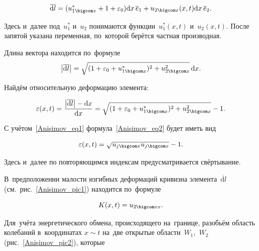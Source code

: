 $$\overline{\mathrm{d}l}=(u^{*}_{1 \bigcom x}+1+\varepsilon_0)\mathrm{d}x\,\overline{e}_1+u_{2 \bigcom x}( x,  t )\mathrm{d}x\,\overline{e}_2.$$

Здесь и~далее под~$u_1^{*}$ и~$u_2$ понимаются функции~$u_1^{*}( x,  t )$ и~$u_2( x,  t )$. После запятой указана переменная, по~которой берётся частная производная.

Длина вектора находится по~формуле $$\left|\overline{\mathrm{d}l}\right|=\sqrt{(1+\varepsilon_0+u_{1 \bigcom x}^{*})^2+u_{2 \bigcom x}^2}\,\mathrm{d}x.$$



Найдём относительную деформацию элемента:

\begin{equation}\label{Anisimov_eq2}

\varepsilon( x,  t )=\frac{\left|\overline{\mathrm{d}l}\right|-\mathrm{d}x}{\mathrm{d}x}= \sqrt{(1+\varepsilon_0+u_{1 \bigcom x}^{*})^2+u_{2 \bigcom x}^2}-1.

\end{equation}

С учётом~\eqref{Anisimov_eq1} формула~\eqref{Anisimov_eq2} будет иметь вид

\begin{equation}\label{Anisimov_eq3}

\varepsilon( x,  t )=\sqrt{u_{j \bigcom x}u_{j \bigcom x}}-1.

\end{equation}

Здесь и~далее по повторяющимся  индексам  предусматривается свёртывание.



В~предположении малости изгибных деформаций  кривизна элемента~$\overline{\mathrm{d}l}$ (см.~рис.~\ref{Anisimov_pic1}) находится по~формуле

\begin{equation}\label{Anisimov_eq4}

K( x,  t )=u_{2 \bigcom xx}.

\end{equation}



\smallskip




Для~учёта энергетического обмена, происходящего на~границе, разобьём область колебаний в~координатах $x\sim t$ на~две открытые области~$W_1$,~$W_2$  (рис.~\ref{Anisimov_pic2}), которые


